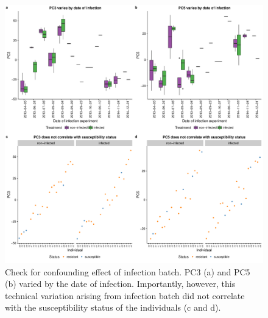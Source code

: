 \documentclass[fleqn,10pt]{wlscirep}
\begin{document}
\begin{figure}[ht]
\centering
\includegraphics[width=\linewidth]{../figure/batch-infection.pdf}
\caption{
Check for confounding effect of infection batch. PC3 (a) and PC5 (b)
varied by the date of infection. Importantly, however, this technical
variation arising from infection batch did not correlate with the
susceptibility status of the individuals (c and d).
}
\label{fig:infection}
\end{figure}
\end{document}
